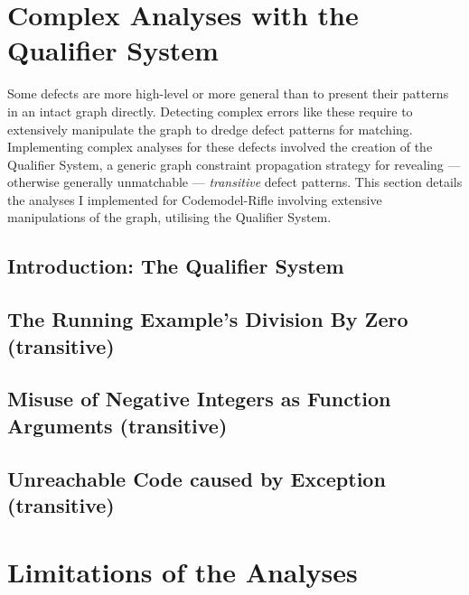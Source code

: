 \section{Complex Analyses with the Qualifier System}

Some defects are more high-level or more general than to present their patterns in an intact graph directly. Detecting complex errors like these require to extensively manipulate the graph to dredge defect patterns for matching. Implementing complex analyses for these defects involved the creation of the Qualifier System, a generic graph constraint propagation strategy for revealing — otherwise generally unmatchable — \emph{transitive} defect patterns. This section details the analyses I implemented for Codemodel-Rifle involving extensive manipulations of the graph, utilising the Qualifier System.


\subsection{Introduction: The Qualifier System}

\subsection{The Running Example's Division By Zero (transitive)}

\subsection{Misuse of Negative Integers as Function Arguments (transitive)}

\subsection{Unreachable Code caused by Exception (transitive)}


\section{Limitations of the Analyses}